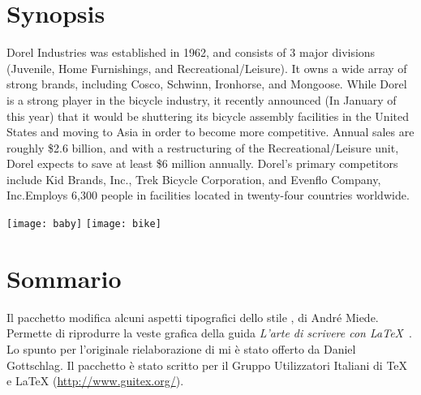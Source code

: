 
\begingroup
\let\clearpage\relax
\let\cleardoublepage\relax
\let\cleardoublepage\relax

\chapter*{Synopsis}
Dorel Industries was established in 1962, and consists of 3 major divisions (Juvenile, Home Furnishings, and Recreational/Leisure).  It owns a wide array of strong brands, including Cosco, Schwinn, Ironhorse, and Mongoose.  While Dorel is a strong player in the bicycle industry, it recently announced (In January of this year) that it would be shuttering its bicycle assembly facilities in the United States and moving to Asia in order to become more competitive.  Annual sales are roughly \$2.6 billion, and with a restructuring of the Recreational/Leisure unit, Dorel expects to save at least \$6 million annually.  Dorel’s primary competitors include Kid Brands, Inc., Trek Bicycle Corporation, and Evenflo Company, Inc.Employs 6,300 people in facilities located in twenty-four countries worldwide.


\vfill
{\texttt{[image: baby]}} 
{\texttt{[image: bike]}} 
\vfill
{}
\chapter*{Sommario}
Il pacchetto modifica alcuni aspetti tipografici dello stile \classicthesis, di André Miede. Permette di riprodurre la veste grafica della guida \emph{L'arte di scrivere con \LaTeX}~\citep{pantieri:art}. Lo spunto per l'originale rielaborazione di \classicthesis{} mi è stato offerto da Daniel Gottschlag. Il pacchetto \`e stato scritto per il Gruppo Utilizzatori Italiani di \TeX{} e \LaTeX{} (\url{http://www.guitex.org/}).


\endgroup			

\vfill

